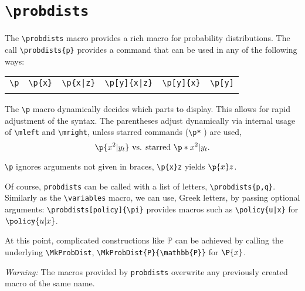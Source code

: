 \section{\texttt{\textbackslash probdists}}\label{sec:probdists}
The \verb|\probdists| macro provides a rich macro for probability distributions.
The call \verb|\probdists{p}| provides a command that can be used in any of the following ways:

\begin{table}[h!]
	\centering
	\begin{tabular}{llllll}
		\verb|\p| & \verb|\p{x}| & \verb=\p{x|z}= & \verb=\p[y]{x|z}= & \verb|\p[y]{x}| & \verb|\p[y]|\\
		\p & \p{x} & \p{x|z} & \p[y]{x|z} & \p[y]{x} & \p[y]
	\end{tabular}
\end{table}
The \verb|\p| macro dynamically decides which parts to display. This allows for rapid adjustment of the syntax. The parentheses adjust dynamically via internal usage of \verb|\mleft| and \verb|\mright|, unless starred commands (\verb|\p*| \etc) are used,
\begin{equation}
	\p{x^2 | y_t} \text{ vs. starred } \p*{x^2 | y_t}.
\end{equation}

\verb|\p| ignores arguments not given in braces, \eg \verb|\p{x}z| yields $\p{x}z$.

Of course, \verb|probdists| can be called with a list of letters, \eg \verb|\probdists{p,q}|. 
Similarly as the \verb|\variables| macro, we can use, \eg Greek letters, by passing optional arguments: 
\verb|\probdists[policy]{\pi}| provides macros such as \verb=\policy{u|x}= for $\policy{u|x}$.

At this point, complicated constructions like $\mathbb{P}$ can be achieved by calling the underlying \verb|\MkProbDist|, \eg \verb|\MkProbDist{P}{\mathbb{P}}| for $\P{x}$.

\emph{Warning:} The macros provided by \verb|probdists| overwrite any previously created macro of the same name.